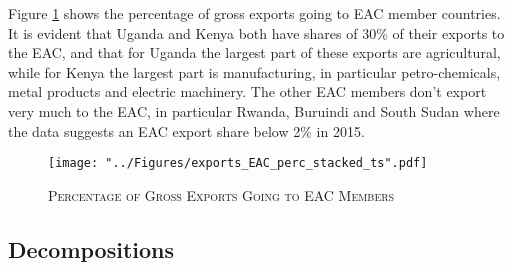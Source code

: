 \documentclass[a4paper]{article}
\begin{document}
Figure \ref{fig:exp_EAC_share} shows the percentage of gross exports going to EAC member countries. It is evident that Uganda and Kenya both have shares of 30\% of their exports to the EAC, and that for Uganda the largest part of these exports are agricultural, while for Kenya the largest part is manufacturing, in particular petro-chemicals, metal products and electric machinery.  The other EAC members don't export very much to the EAC, in particular Rwanda, Buruindi and South Sudan where the data suggests an EAC export share below 2\% in 2015. 

\begin{figure}[h!]
\centering
\caption{\label{fig:exp_EAC_share}\textsc{Percentage of Gross Exports Going to EAC Members}}
\texttt{[image: "../Figures/exports\_EAC\_perc\_stacked\_ts".pdf]} %
\end{figure}
\FloatBarrier

\subsection{Decompositions}




\end{document}
